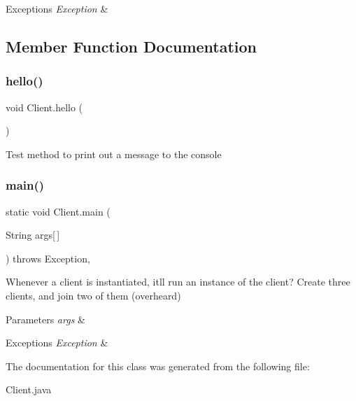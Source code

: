 \begin{DoxyExceptions}{Exceptions}
{\em Exception} & \\
\hline
\end{DoxyExceptions}


\subsection{Member Function Documentation}
\mbox{\label{class_client_a3da0518f6e8503b0b669af247ddfcf62}} 
\subsubsection{\texorpdfstring{hello()}{hello()}}
{\footnotesize\ttfamily void Client.\+hello (\begin{DoxyParamCaption}{ }\end{DoxyParamCaption})\hspace{0.3cm}{\ttfamily [inline]}}

Test method to print out a message to the console \mbox{\label{class_client_ac4219c51358857184ceeb023ada3d8ae}} 
\subsubsection{\texorpdfstring{main()}{main()}}
{\footnotesize\ttfamily static void Client.\+main (\begin{DoxyParamCaption}\item[{String}]{args\mbox{[}$\,$\mbox{]} }\end{DoxyParamCaption}) throws Exception\hspace{0.3cm}{\ttfamily [inline]}, {\ttfamily [static]}}

Whenever a client is instantiated, it\textquotesingle{}ll run an instance of the client? Create three clients, and join two of them (overheard) 
\begin{DoxyParams}{Parameters}
{\em args} & \\
\hline
\end{DoxyParams}

\begin{DoxyExceptions}{Exceptions}
{\em Exception} & \\
\hline
\end{DoxyExceptions}


The documentation for this class was generated from the following file\+:\begin{DoxyCompactItemize}
\item 
Client.\+java\end{DoxyCompactItemize}
